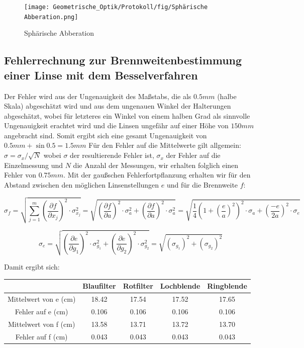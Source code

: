 \begin{figure}
    \centering
    \texttt{[image: Geometrische\_Optik/Protokoll/fig/Sphärische Abberation.png]}
    \caption{Sphärische Abberation}
    \label{fig:Sphärische Abberation}
\end{figure}

\subsection{Fehlerrechnung zur Brennweitenbestimmung einer Linse mit dem Besselverfahren}
Der Fehler wird aus der Ungenauigkeit des Maßstabs, die als $0.5mm$ (halbe Skala) abgeschätzt wird und aus dem ungenauen Winkel der Halterungen abgeschätzt, wobei für letzteres ein Winkel von einem halben Grad als sinnvolle Ungenauigkeit erachtet wird und die Linsen ungefähr auf einer Höhe von $150mm$ angebracht sind. Somit ergibt sich eine gesamt Ungenauigkeit von $0.5mm + \sin{0.5} = 1.5mm$
Für den Fehler auf die Mittelwerte gilt allgemein: $\sigma = \sigma_x / \sqrt{N}$ wobei $\sigma$ der resultierende Fehler ist, $\sigma_x$ der Fehler auf die Einzelmessung und $N$ die Anzahl der Messungen, wir erhalten folglich einen Fehler von $0.75mm$.
Mit der gaußschen Fehlerfortpflanzung erhalten wir für den Abstand zwischen den möglichen Linsenstellungen $e$ und für die Brennweite $f$:

\begin{equation}
    \sigma_f = \sqrt{\sum_{j=1}^m(\frac{\partial f}{\partial x_j})^2 \cdot \sigma_{x_j}^2} 
    =\sqrt{(\frac{\partial f}{\partial a})^2 \cdot \sigma_{a}^2 + (\frac{\partial f}{\partial a})^2 \cdot \sigma_{a}^2} 
    =\sqrt{\frac{1}{4}(1+(\frac{e}{a})^2)^2 \cdot \sigma_a + (\frac{-e}{2a})^2 \cdot \sigma_e}
\end{equation}

\begin{equation}
    \sigma_e
    =\sqrt{(\frac{\partial e}{\partial g_1})^2 \cdot \sigma_{g_1}^2 + (\frac{\partial e}{\partial g_2})^2 \cdot \sigma_{g_2}^2} 
    =\sqrt{(\sigma_{g_1})^2 + (\sigma_{g_2})^2}
\end{equation}

Damit ergibt sich:
\begin{tabular}{|c|c|c|c|c|}
	\hline
	& Blaufilter & Rotfilter & Lochblende & Ringblende \\
	\hline
	Mittelwert von e (cm) & 18.42 & 17.54 & 17.52 & 17.65 \\
	\hline
	Fehler auf e (cm) & 0.106 & 0.106 & 0.106 & 0.106 \\
	\hline
	Mittelwert von f (cm) & 13.58 & 13.71 & 13.72 & 13.70 \\
	\hline
	Fehler auf f (cm) & 0.043 & 0.043 & 0.043 & 0.043 \\
	\hline
\end{tabular}



